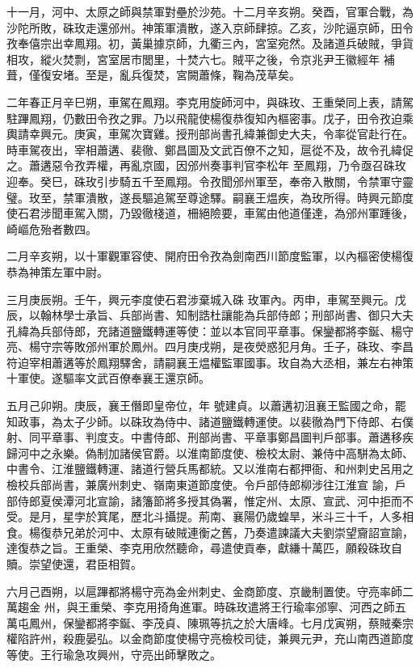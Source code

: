 \begin{pinyinscope}
 十一月，河中、太原之師與禁軍對壘於沙苑。十二月辛亥朔。癸酉，官軍合戰，為沙陀所敗，硃玫走還邠州。神策軍潰散，遂入京師肆掠。乙亥，沙陀逼京師，田令孜奉僖宗出幸鳳翔。初，黃巢據京師，九衢三內，宮室宛然。及諸道兵破賊，爭貨相攻，縱火焚剽，宮室居市閭里，十焚六七。賊平之後，令京兆尹王徽經年
 補葺，僅復安堵。至是，亂兵復焚，宮闕蕭條，鞠為茂草矣。



 二年春正月辛巳朔，車駕在鳳翔。李克用旋師河中，與硃玫、王重榮同上表，請駕駐蹕鳳翔，仍數田令孜之罪。乃以飛龍使楊復恭復知內樞密事。戊子，田令孜迫乘輿請幸興元。庚寅，車駕次寶雞。授刑部尚書孔緯兼御史大夫，令率從官赴行在。時車駕夜出，宰相蕭遘、裴徹、鄭昌圖及文武百僚不之知，扈從不及，故令孔緯促之。蕭遘惡令孜弄權，再亂京國，因邠州奏事判官李松年
 至鳳翔，乃令亟召硃玫迎奉。癸巳，硃玫引步騎五千至鳳翔。令孜聞邠州軍至，奉帝入散關，令禁軍守靈璧。玫至，禁軍潰散，遂長驅追駕至尊途驛。嗣襄王煴疾，為玫所得。時興元節度使石君涉聞車駕入關，乃毀徹棧道，柵絕險要，車駕由他道僅達，為邠州軍踵後，崎嶇危殆者數四。



 二月辛亥朔，以十軍觀軍容使、開府田令孜為劍南西川節度監軍，以內樞密使楊復恭為神策左軍中尉。



 三月庚辰朔。壬午，興元李度使石君涉棄城入硃
 玫軍內。丙申，車駕至興元。戊辰，以翰林學士承旨、兵部尚書、知制誥杜讓能為兵部侍郎；刑部尚書、御只大夫孔緯為兵部侍郎，充諸道鹽鐵轉運等使：並以本官同平章事。保鑾都將李鋋、楊守亮、楊守宗等敗邠州軍於鳳州。四月庚戌朔，是夜熒惑犯月角。壬子，硃玫、李昌符迫宰相蕭遘等於鳳翔驛舍，請嗣襄王煴權監軍國事。玫自為大丞相，兼左右神策十軍使。遂驅率文武百僚奉襄王還京師。



 五月己卯朔。庚辰，襄王僭即皇帝位，年
 號建貞。以蕭遘初沮襄王監國之命，罷知政事，為太子少師。以硃玫為侍中、諸道鹽鐵轉運使。以裴徹為門下侍郎、右僕射、同平章事、判度支。中書侍郎、刑部尚書、平章事鄭昌圖判戶部事。蕭遘移疾歸河中之永樂。偽制加諸侯官爵。以淮南節度使、檢校太尉、兼侍中高駢為太師、中書令、江淮鹽鐵轉運、諸道行營兵馬都統。又以淮南右都押衙、和州刺史呂用之檢校兵部尚書，兼廣州刺史、嶺南東道節度使。令戶部侍郎柳涉往江淮宣
 諭，戶部侍郎夏侯潭河北宣諭，諸籓節將多授其偽署，惟定州、太原、宣武、河中拒而不受。是月，星孛於箕尾，歷北斗攝提。荊南、襄陽仍歲蝗旱，米斗三十千，人多相食。楊復恭兄弟於河中、太原有破賊連衡之舊，乃奏遣諫議大夫劉崇望齎詔宣諭，達復恭之旨。王重榮、李克用欣然聽命，尋遣使貢奉，獻縑十萬匹，願殺硃玫自贖。崇望使還，君臣相賀。



 六月己酉朔，以扈蹕都將楊守亮為金州刺史、金商節度、京畿制置使。守亮率師二萬趨金
 州，與王重榮、李克用掎角進軍。時硃玫遣將王行瑜率邠寧、河西之師五萬屯鳳州，保鑾都將李鋋、李茂貞、陳珮等抗之於大唐峰。七月戊寅朔，蔡賊秦宗權陷許州，殺鹿晏弘。以金商節度使楊守亮檢校司徒，兼興元尹，充山南西道節度等使。王行瑜急攻興州，守亮出師擊敗之。




\end{pinyinscope}
